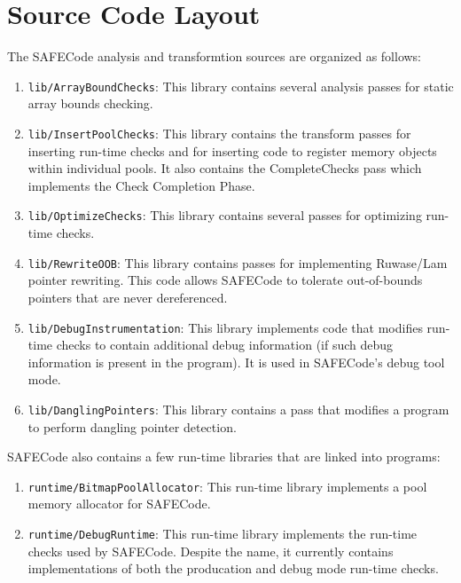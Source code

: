 \section{Source Code Layout}
\label{section:layout}

The SAFECode analysis and transformtion sources are organized as follows:

\begin{enumerate}
\item{{\tt lib/ArrayBoundChecks}:}
This library contains several analysis passes for static array bounds
checking.

\item{{\tt lib/InsertPoolChecks}:}
This library contains the transform passes for inserting run-time
checks and for inserting code to register memory objects within
individual pools.  It also contains the CompleteChecks pass which
implements the Check Completion Phase.

\item{{\tt lib/OptimizeChecks}:}
This library contains several passes for optimizing run-time checks.

\item{{\tt lib/RewriteOOB}:}
This library contains passes for implementing Ruwase/Lam pointer
rewriting.  This code allows SAFECode to tolerate out-of-bounds pointers
that are never dereferenced.

\item{{\tt lib/DebugInstrumentation}:}
This library implements code that modifies run-time checks to contain
additional debug information (if such debug information is present in the
program).  It is used in SAFECode's debug tool mode.

\item{{\tt lib/DanglingPointers}:}
This library contains a pass that modifies a program to perform
dangling pointer detection.
\end{enumerate}

SAFECode also contains a few run-time libraries that are linked into
programs:

\begin{enumerate}
\item{{\tt runtime/BitmapPoolAllocator}:}
This run-time library implements a pool memory allocator for SAFECode.

\item{{\tt runtime/DebugRuntime}:}
This run-time library implements the run-time checks used by SAFECode.
Despite the name, it currently contains implementations of both the
producation and debug mode run-time checks.
\end{enumerate}
